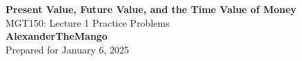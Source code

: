 \begin{titlepage}
    \null %
    \vfill
    \begin{center}
        {\fontsize{40}{48}\selectfont \bfseries Present Value, Future Value, and the Time Value of Money}
        \vspace{20pt} \\
        {\LARGE MGT150: Lecture 1 Practice Problems} \\
        \vspace{20pt}
        \textbf{AlexanderTheMango}
        \vspace{8pt}
        \\ Prepared for January 6, 2025
    \end{center}
    \vfill
\end{titlepage}
